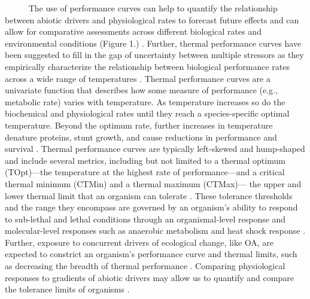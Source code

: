 \documentclass[
  12pt,
]{article}
\begin{document}
~~~~~ The use of performance curves can help to quantify the
relationship between abiotic drivers and physiological rates to forecast
future effects \cite{kroeker2017embracing} and can allow for comparative
assessments across different biological rates and environmental
conditions (Figure 1.)
\cite{schulte2011thermal, silbiger2019comparative, silva2021local, padfield2021rtpc, becker2020nutrient}.
Further, thermal performance curves have been suggested to fill in the
gap of uncertainty between multiple stressors as they empirically
characterize the relationship between biological performance rates
across a wide range of temperatures
\cite{padfield2021rtpc, schulte2011thermal, silbiger2019comparative}.
Thermal performance curves are a univariate function that describes how
some measure of performance (e.g., metabolic rate) varies with
temperature. As temperature increases so do the biochemical and
physiological rates until they reach a species-specific optimal
temperature. Beyond the optimum rate, further increases in temperature
denature proteins, stunt growth, and cause reductions in performance and
survival \cite{somero2002thermal, portner2002climate}. Thermal
performance curves are typically left-skewed and hump-shaped and include
several metrics, including but not limited to a thermal optimum
(TOpt)---the temperature at the highest rate of performance---and a
critical thermal minimum (CTMin) and a thermal maximum (CTMax)--- the
upper and lower thermal limit that an organism can tolerate
\cite{schulte2011thermal, huey1979integrating, huey1989evolution}. These
tolerance thresholds and the range they encompass are governed by an
organism's ability to respond to sub-lethal and lethal conditions
through an organismal-level response and molecular-level responses such
as anaerobic metabolism and heat shock response
\cite{portner2017oxygen, somero2002thermal}. Further, exposure to
concurrent drivers of ecological change, like OA, are expected to
constrict an organism's performance curve and thermal limits, such as
decreasing the breadth of thermal performance
\cite{portner2008physiology, portner2010oxygen}. Comparing physiological
responses to gradients of abiotic drivers may allow us to quantify and
compare the tolerance limits of organisms
\cite{silbiger2019comparative}.
\end{document}
